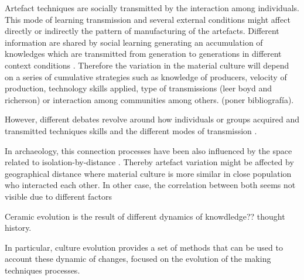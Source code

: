\documentclass[review]{elsarticle}
\begin{document}
Artefact techniques are socially transmitted by the interaction among individuals.
This mode of learning transmission and several external conditions might affect directly or indirectly the pattern of manufacturing of the artefacts. Different information are shared by social learning generating an accumulation of knowledges which are transmitted from generation to generations in different context conditions  \citep{neff1992ceramics,henrich_evolution_2003, boyd_cultural_2011}. Therefore the variation in the material culture will depend on a series of cumulative strategies such as knowledge of producers, velocity of production, technology skills applied, type of transmissions (leer boyd and richerson) or interaction among communities among others. (poner bibliografía). 

However, different debates revolve around how individuals or groups acquired and transmitted techniques skills and the different modes of transmission   \citep{bowser_learning_2008, mesoudi_cultural_2008, roux_standardization_2015}.     



In archaeology, this connection processes have been also influenced by the space related to isolation-by-distance \citep{bjorklund_effect_2010,shennan_isolation-by-distance_2015, van_strien_isolation-by-distance_2015}. Thereby artefact variation might be affected by geographical distance where material culture is more similar in close population who interacted each other. In other case, the correlation between both seems not visible due to different factors \citep{hart_effects_2012}



Ceramic evolution is the result of different dynamics of knowdledge?? thought history. 
   


In particular, culture evolution provides a set of methods that can be used to account these dynamic of changes, focused on the evolution of the making techniques processes. 





\end{document}
